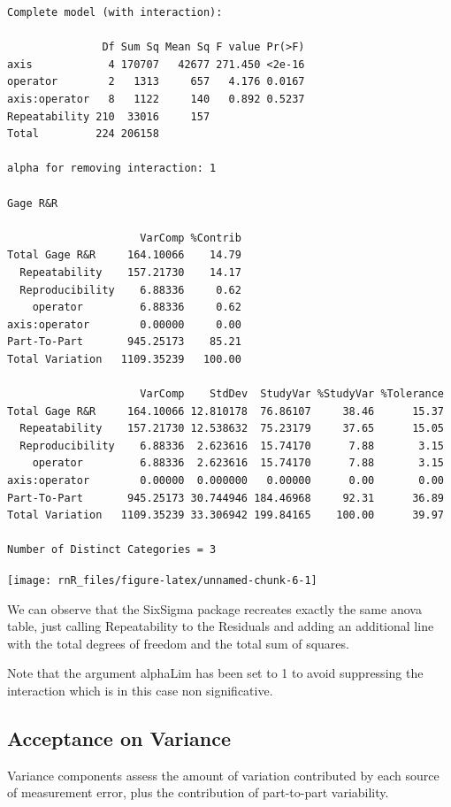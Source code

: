 \documentclass[
]{book}
\begin{document}
\begin{verbatim}
Complete model (with interaction):

               Df Sum Sq Mean Sq F value Pr(>F)
axis            4 170707   42677 271.450 <2e-16
operator        2   1313     657   4.176 0.0167
axis:operator   8   1122     140   0.892 0.5237
Repeatability 210  33016     157               
Total         224 206158                       

alpha for removing interaction: 1 

Gage R&R

                     VarComp %Contrib
Total Gage R&R     164.10066    14.79
  Repeatability    157.21730    14.17
  Reproducibility    6.88336     0.62
    operator         6.88336     0.62
axis:operator        0.00000     0.00
Part-To-Part       945.25173    85.21
Total Variation   1109.35239   100.00

                     VarComp    StdDev  StudyVar %StudyVar %Tolerance
Total Gage R&R     164.10066 12.810178  76.86107     38.46      15.37
  Repeatability    157.21730 12.538632  75.23179     37.65      15.05
  Reproducibility    6.88336  2.623616  15.74170      7.88       3.15
    operator         6.88336  2.623616  15.74170      7.88       3.15
axis:operator        0.00000  0.000000   0.00000      0.00       0.00
Part-To-Part       945.25173 30.744946 184.46968     92.31      36.89
Total Variation   1109.35239 33.306942 199.84165    100.00      39.97

Number of Distinct Categories = 3 
\end{verbatim}

\texttt{[image: rnR\_files/figure-latex/unnamed-chunk-6-1]}

We can observe that the SixSigma package recreates exactly the same anova table, just calling Repeatability to the Residuals and adding an additional line with the total degrees of freedom and the total sum of squares.

Note that the argument alphaLim has been set to 1 to avoid suppressing the interaction which is in this case non significative.

\hypertarget{acceptance-on-variance}{%
\subsection{Acceptance on Variance}\label{acceptance-on-variance}}

Variance components assess the amount of variation contributed by each source of measurement error, plus the contribution of part-to-part variability.
\end{document}
